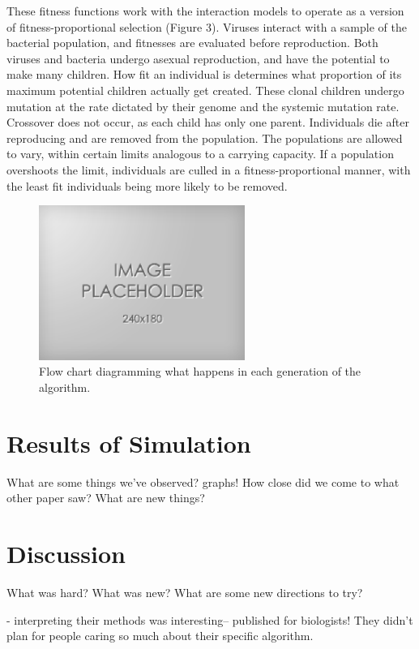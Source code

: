 \documentclass[11pt, oneside]{article}
\begin{document}
These fitness functions work with the interaction models to operate as a version of fitness-proportional selection (Figure 3). Viruses interact with a sample of the bacterial population, and fitnesses are evaluated before reproduction. Both viruses and bacteria undergo asexual reproduction, and have the potential to make many children. How fit an individual is determines what proportion of its maximum potential children actually get created. These clonal children undergo mutation at the rate dictated by their genome and the systemic mutation rate. Crossover does not occur, as each child has only one parent. Individuals die after reproducing and are removed from the population. The populations are allowed to vary, within certain limits analogous to a carrying capacity. If a population overshoots the limit, individuals are culled in a fitness-proportional manner, with the least fit individuals being more likely to be removed.

\begin{figure}[H]
	\centering
	\includegraphics[width=0.6\textwidth]{placeholder.png}
	\caption{Flow chart diagramming what happens in each generation of the algorithm.}
\end{figure}

\section{Results of Simulation}
What are some things we've observed? graphs! How close did we come to what other paper saw? What are new things?

\section{Discussion}
What was hard? What was new? What are some new directions to try?

- interpreting their methods was interesting-- published for biologists! They didn't plan for people caring so much about their specific algorithm. 
\end{document}
